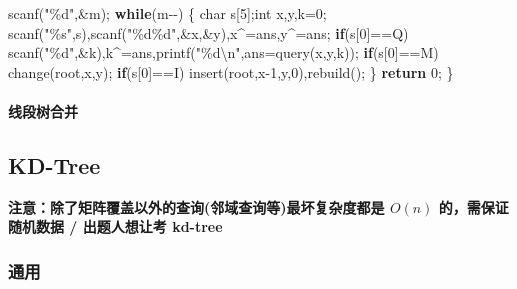 \documentclass[
]{article}
\newenvironment{Shaded}{}{}
\newcommand{\CharTok}[1]{\textcolor[rgb]{0.25,0.44,0.63}{#1}}
\newcommand{\ControlFlowTok}[1]{\textcolor[rgb]{0.00,0.44,0.13}{\textbf{#1}}}
\newcommand{\DataTypeTok}[1]{\textcolor[rgb]{0.56,0.13,0.00}{#1}}
\newcommand{\DecValTok}[1]{\textcolor[rgb]{0.25,0.63,0.44}{#1}}
\newcommand{\NormalTok}[1]{#1}
\newcommand{\SpecialCharTok}[1]{\textcolor[rgb]{0.25,0.44,0.63}{#1}}
\newcommand{\StringTok}[1]{\textcolor[rgb]{0.25,0.44,0.63}{#1}}
\begin{document}
\begin{Shaded}
\begin{Highlighting}[]
\NormalTok{    scanf(}\StringTok{"}\SpecialCharTok{\%d}\StringTok{"}\NormalTok{,\&m);}
    \ControlFlowTok{while}\NormalTok{(m{-}{-})}
\NormalTok{    \{}
        \DataTypeTok{char}\NormalTok{ s[}\DecValTok{5}\NormalTok{];}\DataTypeTok{int}\NormalTok{ x,y,k=}\DecValTok{0}\NormalTok{;}
\NormalTok{        scanf(}\StringTok{"}\SpecialCharTok{\%s}\StringTok{"}\NormalTok{,s),scanf(}\StringTok{"}\SpecialCharTok{\%d\%d}\StringTok{"}\NormalTok{,\&x,\&y),x\^{}=ans,y\^{}=ans;}
        \ControlFlowTok{if}\NormalTok{(s[}\DecValTok{0}\NormalTok{]==}\CharTok{\textquotesingle{}Q\textquotesingle{}}\NormalTok{) scanf(}\StringTok{"}\SpecialCharTok{\%d}\StringTok{"}\NormalTok{,\&k),k\^{}=ans,printf(}\StringTok{"}\SpecialCharTok{\%d\textbackslash{}n}\StringTok{"}\NormalTok{,ans=query(x,y,k));}
        \ControlFlowTok{if}\NormalTok{(s[}\DecValTok{0}\NormalTok{]==}\CharTok{\textquotesingle{}M\textquotesingle{}}\NormalTok{) change(root,x,y);}
        \ControlFlowTok{if}\NormalTok{(s[}\DecValTok{0}\NormalTok{]==}\CharTok{\textquotesingle{}I\textquotesingle{}}\NormalTok{) insert(root,x{-}}\DecValTok{1}\NormalTok{,y,}\DecValTok{0}\NormalTok{),rebuild();}
\NormalTok{    \}}
    \ControlFlowTok{return} \DecValTok{0}\NormalTok{;}
\NormalTok{\}}
\end{Highlighting}
\end{Shaded}

\hypertarget{ux7ebfux6bb5ux6811ux5408ux5e76-1}{%
\paragraph{线段树合并}\label{ux7ebfux6bb5ux6811ux5408ux5e76-1}}

\hypertarget{kd-tree}{%
\subsection{KD-Tree}\label{kd-tree}}

\textbf{注意：除了矩阵覆盖以外的查询(邻域查询等)最坏复杂度都是 \(O(n)\)
的，需保证 随机数据 / 出题人想让考 kd-tree}

\hypertarget{ux901aux7528}{%
\subsubsection{通用}\label{ux901aux7528}}
\end{document}
